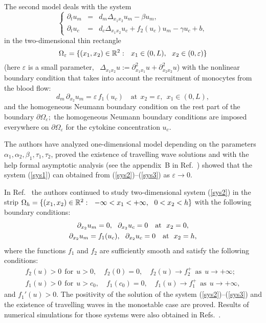 \documentclass[reqno]{amsart}            %
\numberwithin{equation}{section}
\begin{document}
The second model  deals  with  the system
\begin{equation}\label{sys2}
\left\{
    \begin{array}{rcl}
\partial_{t}u_m  &=& d_m \Delta_{x_1x_2} u_m  - \beta u_m,
                                        \\[2mm]
\partial_{t}u_c  &=& d_c \Delta_{x_1x_2} u_c + f_2(u_c) u_m  - \gamma u_c + b,
\end{array}
\right.
\end{equation}
in the two-dimensional thin rectangle
$$
\Omega_\varepsilon = \{(x_1, x_2)\in \Bbb R^2: \ \ x_1 \in (0, L), \ \  x_2 \in (0, \varepsilon)\}
$$
(here $\varepsilon$ is a small parameter, \ $\Delta_{x_1x_2} u := \partial^2_{x_1x_1} u + \partial^2_{x_2x_2} u$) with
the nonlinear boundary condition that takes  into account the recruitment of monocytes from the blood flow:
\begin{equation}\label{sys3}
   d_m \,\partial_{x_2} u_m = \varepsilon\, f_1(u_c)  \quad \text{at} \ \ x_2=\varepsilon, \ \ x_1 \in (0, L),
\end{equation}
and the homogeneous Neumann boundary condition on the rest part of the boundary $\partial \Omega_\varepsilon;$
the homogeneous Neumann boundary conditions are imposed everywhere
on $\partial \Omega_\varepsilon$ for  the cytokine concentration $u_c$.


The authors have analyzed one-dimensional model depending on the parameters $\alpha_1, \alpha_2, \beta_1, \tau_1, \tau_2$, proved the existence of travelling wave solutions and with the help formal asymptotic analysis  (see the appendix~B in Ref.~\cite{KhaGenKazVol-07}) showed that the system (\ref{sys1}) can obtained from (\ref{sys2})--(\ref{sys3}) as $\varepsilon \to 0.$

In Ref.~\cite{KhaGenKazVol-12} the authors continued to study two-dimensional system (\ref{sys2}) in the strip
 $\Omega_h = \{(x_1, x_2)\in \Bbb R^2: \ \ -\infty <x_1 < +\infty, \ \ 0< x_2 < h\}$ with
the following boundary conditions:
\begin{gather}
\partial_{x_2} u_m = 0, \ \ \partial_{x_2} u_c = 0  \quad \text{at} \ \ x_2=0, \notag
\\
\partial_{x_2} u_m = f_1(u_c), \ \ \partial_{x_2} u_c = 0 \quad \text{at} \ \ x_2=h, \label{bc-1}
\end{gather}
where the functions $f_1$ and $f_2$ are sufficiently smooth and satisfy the following conditions:
\begin{gather}\label{cond0}
f_2(u) > 0 \ \ \text{for} \ \ u > 0, \quad f_2(0)=0, \quad f_2(u) \to f_2^+ \ \ \text{as} \ \ u \to +\infty;
\\
f_1(u) > 0 \ \ \text{for} \ \ u > c_0,  \quad f_1(c_0)=0, \quad f_1(u) \to f_1^+ \ \ \text{as} \ \ u \to +\infty, \label{cond0-1}
\end{gather}
and $f_1'(u) > 0.$ The positivity of the solution of the system (\ref{sys2})--(\ref{sys3}) and
the existence of travelling waves in the monostable case are proved. Results of numerical simulations for those systems were also obtained
in Refs.~\cite{KhaGenKazVol-07,KhaGenKazVol-12}.
\end{document}
